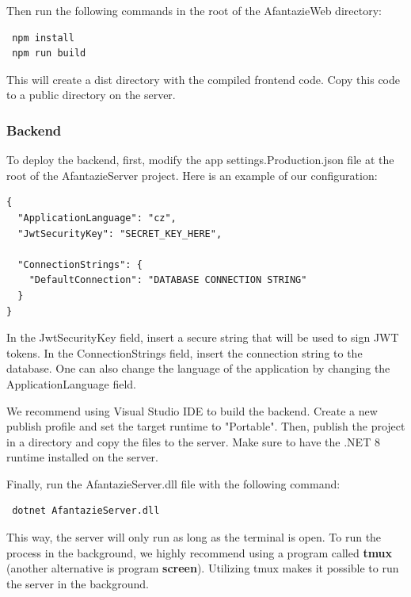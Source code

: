 Then run the following commands in the root of the AfantazieWeb directory:
\begin{lstlisting}
 npm install
 npm run build
\end{lstlisting}

This will create a dist directory with the compiled frontend code.
Copy this code to a public directory on the server.

\subsubsection{Backend}
To deploy the backend, first, modify the app settings.Production.json file at the root of the AfantazieServer project.
Here is an example of our configuration:
\begin{lstlisting}
{
  "ApplicationLanguage": "cz",
  "JwtSecurityKey": "SECRET_KEY_HERE",

  "ConnectionStrings": {
    "DefaultConnection": "DATABASE CONNECTION STRING"
  }
}
\end{lstlisting}

In the JwtSecurityKey field, insert a secure string that will be used to sign JWT tokens.
In the ConnectionStrings field, insert the connection string to the database.
One can also change the language of the application by changing the ApplicationLanguage field.

We recommend using Visual Studio IDE to build the backend.
Create a new publish profile and set the target runtime to "Portable".
Then, publish the project in a directory and copy the files to the server.
Make sure to have the .NET 8 runtime installed on the server.

Finally, run the AfantazieServer.dll file with the following command:
\begin{lstlisting}
 dotnet AfantazieServer.dll
\end{lstlisting}

This way, the server will only run as long as the terminal is open.
To run the process in the background, we highly recommend using a program called \textbf{tmux} (another alternative is program \textbf{screen}).
Utilizing tmux makes it possible to run the server in the background.

